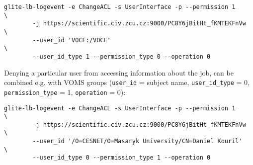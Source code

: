 \begin{verbatim}
glite-lb-logevent -e ChangeACL -s UserInterface -p --permission 1       \
        -j https://scientific.civ.zcu.cz:9000/PC8Y6jBitHt_fKMTEKFnVw    \
        --user_id 'VOCE:/VOCE'                                          \
        --user_id_type 1 --permission_type 0 --operation 0
\end{verbatim}


Denying a particular user from accessing information about the job, can be
combined e.g. with VOMS groups (\verb'user_id' = subject name,
\verb'user_id_type' = 0, \verb'permission_type' = 1, \verb'operation' = 0):

\begin{verbatim}
glite-lb-logevent -e ChangeACL -s UserInterface -p --permission 1       \
        -j https://scientific.civ.zcu.cz:9000/PC8Y6jBitHt_fKMTEKFnVw    \
        --user_id '/O=CESNET/O=Masaryk University/CN=Daniel Kouril'     \
        --user_id_type 0 --permission_type 1 --operation 0
\end{verbatim}

